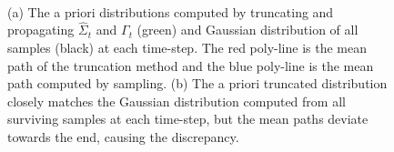 \documentclass[letterpaper]{article}
\begin{document}
\begin{figure}[t]
\begin{center}
\\
\vspace{-20pt}
\end{center}
\caption{ (a) The a priori distributions computed by truncating and propagating $\hat{\Sigma}_t$ and $\Gamma_t$ (green) and Gaussian distribution of all samples (black) at each time-step. The red poly-line is the mean path of the truncation method and the blue poly-line is the mean path computed by sampling. (b) The a priori truncated distribution closely matches the Gaussian distribution computed from all surviving samples at each time-step, but the mean paths deviate towards the end, causing the discrepancy.}
\label{fig:panel2}
\end{figure}
\end{document}
